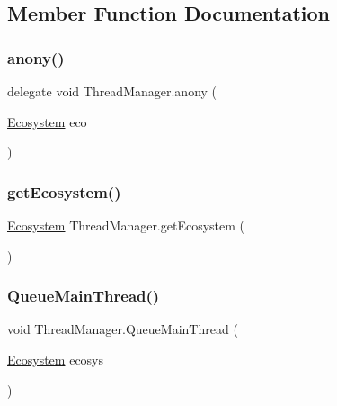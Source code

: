 \subsection{Member Function Documentation}
\mbox{\label{class_thread_manager_a31b09b282d070ea1e0d6ca52af4a64b6}} 
\subsubsection{\texorpdfstring{anony()}{anony()}}
{\footnotesize\ttfamily delegate void Thread\+Manager.\+anony (\begin{DoxyParamCaption}\item[{\mbox{\hyperlink{class_ecosystem}{Ecosystem}}}]{eco }\end{DoxyParamCaption})}

\mbox{\label{class_thread_manager_ad8339ead9d54c051097f3b5ba3b963f3}} 
\subsubsection{\texorpdfstring{get\+Ecosystem()}{getEcosystem()}}
{\footnotesize\ttfamily \mbox{\hyperlink{class_ecosystem}{Ecosystem}} Thread\+Manager.\+get\+Ecosystem (\begin{DoxyParamCaption}{ }\end{DoxyParamCaption})}

\mbox{\label{class_thread_manager_a1924e893092403b573090341efa87380}} 
\subsubsection{\texorpdfstring{Queue\+Main\+Thread()}{QueueMainThread()}}
{\footnotesize\ttfamily void Thread\+Manager.\+Queue\+Main\+Thread (\begin{DoxyParamCaption}\item[{\mbox{\hyperlink{class_ecosystem}{Ecosystem}}}]{ecosys }\end{DoxyParamCaption})}

